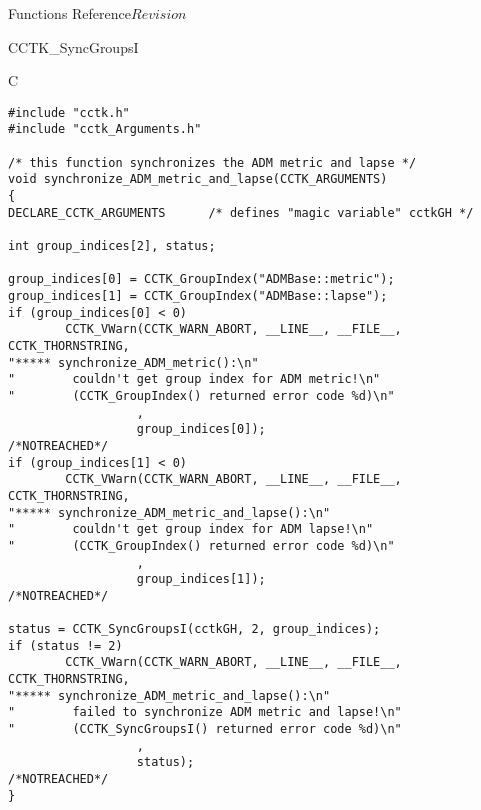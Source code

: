 \begin{cactuspart}{ Functions Reference}{}{$Revision$}
\begin{FunctionDescription}{CCTK\_SyncGroupsI}

\begin{ExampleSection}
\begin{Example}{C}
\begin{verbatim}
#include "cctk.h"
#include "cctk_Arguments.h"

/* this function synchronizes the ADM metric and lapse */
void synchronize_ADM_metric_and_lapse(CCTK_ARGUMENTS)
{
DECLARE_CCTK_ARGUMENTS      /* defines "magic variable" cctkGH */

int group_indices[2], status;

group_indices[0] = CCTK_GroupIndex("ADMBase::metric");
group_indices[1] = CCTK_GroupIndex("ADMBase::lapse");
if (group_indices[0] < 0)
        CCTK_VWarn(CCTK_WARN_ABORT, __LINE__, __FILE__, CCTK_THORNSTRING,
"***** synchronize_ADM_metric():\n"
"        couldn't get group index for ADM metric!\n"
"        (CCTK_GroupIndex() returned error code %d)\n"
                  ,
                  group_indices[0]);                            /*NOTREACHED*/
if (group_indices[1] < 0)
        CCTK_VWarn(CCTK_WARN_ABORT, __LINE__, __FILE__, CCTK_THORNSTRING,
"***** synchronize_ADM_metric_and_lapse():\n"
"        couldn't get group index for ADM lapse!\n"
"        (CCTK_GroupIndex() returned error code %d)\n"
                  ,
                  group_indices[1]);                            /*NOTREACHED*/

status = CCTK_SyncGroupsI(cctkGH, 2, group_indices);
if (status != 2)
        CCTK_VWarn(CCTK_WARN_ABORT, __LINE__, __FILE__, CCTK_THORNSTRING,
"***** synchronize_ADM_metric_and_lapse():\n"
"        failed to synchronize ADM metric and lapse!\n"
"        (CCTK_SyncGroupsI() returned error code %d)\n"
                  ,
                  status);                                 /*NOTREACHED*/
}
\end{verbatim}
\end{Example}
\end{ExampleSection}
\end{FunctionDescription}






\end{cactuspart}

